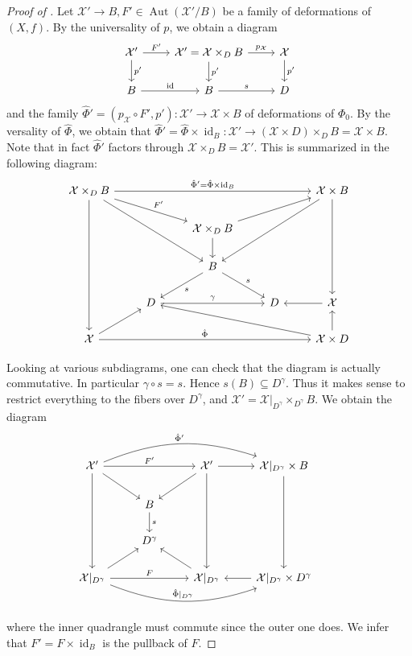 \documentclass{amsart}
\theoremstyle{definition}
\theoremstyle{plain}
\DeclareMathOperator{\id}{id}
\DeclareMathOperator{\Aut}{Aut}
\newcommand{\X}{\mathcal{X}}
\begin{document}
\begin{proof}[Proof of ]
Let $\X' \rightarrow B, F'\in \Aut(\X'/B)$ be a family of deformations of $(X,f)$.
By the universality of $p$, we obtain a diagram
\[
\begin{tikzcd}
 \X' \arrow[r," F'"]\arrow[d,"p'"] & \X'=\X \times_D B  \arrow[r,"p_\X"]\arrow[d,"p'"]& \X \arrow[d,"p'"]\\
 B \arrow[r,"\id"]& B \arrow[r,"s"] &  D
\end{tikzcd}
\]
and the family $\hat{\Phi}'= (p_\X \circ F',p')\colon \X' \rightarrow \X \times B$ of deformations of $\Phi_0$.
By the versality of $\hat{\Phi}$, we obtain that
$\hat{\Phi}' = \hat{\Phi} \times \id_B \colon \X' \rightarrow (\X \times D) \times_D B = \X \times B$.
Note that in fact $\hat{\Phi}'$ factors through $\X \times_D B =\X'$. This is summarized in the following diagram:
\[
\begin{tikzcd}
 \X\times_D B \arrow[rrrr, "\hat{\Phi}'=\hat{\Phi} \times \id_B"]\arrow[ddrr]\arrow[dddd] \arrow[drr,"F'"]&  &  &  & \X \times B \arrow[lldd]\arrow[ddd]\\
  &  &\X\times_D B \arrow[d] \arrow[urr]&  & \\
     &  &B \arrow[dl,"s"]\arrow[dr,"s"] &  &\\
     &D \arrow[rr,"\gamma"]&  &D & \X \arrow[l]\\
 \X \arrow[ur]\arrow[rrrr,"\hat{\Phi}"] &  &  &  & \X \times D \arrow[u]\arrow[lllu]
\end{tikzcd}
\]

Looking at various subdiagrams, one can check that the diagram is actually commutative.
In particular $\gamma \circ s = s$. Hence $s(B) \subseteq D^\gamma$. Thus it makes sense to restrict everything to the fibers over $D^\gamma$, and $\X' = \X|_{D^\gamma} \times_{D^\gamma} B$.
We obtain the diagram
\[
\begin{tikzcd}
 \X' \arrow[ddd]\arrow[rr,"F'"]\arrow[bend left=20, rrr,"\hat{\Phi}'"]\arrow[dr] & & \X'\arrow[dl] \arrow[ddd] \arrow[r]&\X|_{D^\gamma} \times B \arrow[ddd]\\
 & B \arrow[d,"s"]&  & &\\
 & D^\gamma&  & &\\
 \X|_{D^\gamma} \arrow[bend right=20,rrr,"\hat{\Phi}|_{D^\gamma}"]\arrow[ur]\arrow[rr,"F"] & & \X|_{D^\gamma} \arrow[lu]&\X|_{D^\gamma} \times D^{\gamma} \arrow[l]
\end{tikzcd}
 \]


\noindent where the inner quadrangle must commute since the outer one does. We infer that $F'=F \times \id_B$ is the pullback of $F$.
\end{proof}
\end{document}
